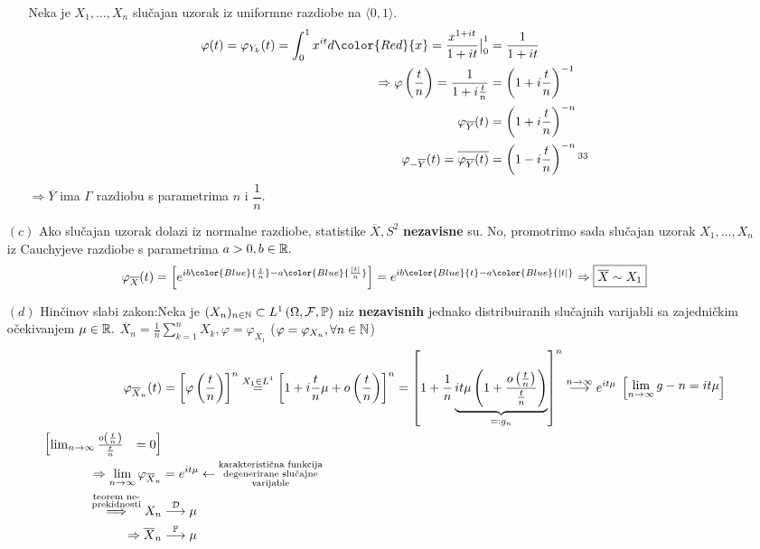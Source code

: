 \documentclass{article}
\begin{document}
\begin{enumerate}
\begin{enumerate}
        \item[] Neka je \(X_1,\ldots,X_n\) slučajan uzorak iz uniformne razdiobe na \(\langle 0,1\rangle.\) \[\begin{aligned}\varphi(t)=\varphi_{Y_k}(t)=\int_0^1x^{it}d{\color{Red}{x}}=\frac{x^{1+it}}{1+it}\big|_0^1&=\frac1{1+it}\\\Rightarrow\varphi\left(\frac{t}n\right)=\frac1{1+i\frac{t}n}&=\left(1+i\frac{t}n\right)^{-1}\\\varphi_{\overline Y}(t)&=\left(1+i\frac{t}n\right)^{-n}\\\varphi_{-\overline Y}(t)=\overline{\varphi_{\overline Y}(t)}&=\left(1-i\frac{t}n\right)^{-n}\footnotemark[33]\end{aligned}\]  \(\Rightarrow\overline Y\) ima \(\Gamma\) razdiobu s parametrima \(n\) i \(\dfrac1n.\) 
    \end{enumerate}
    \item[\((c)\)] Ako slučajan uzorak dolazi iz normalne razdiobe, statistike \(\overline X,S^2\) \textbf{nezavisne} su. No, promotrimo sada slučajan uzorak \(X_1,\ldots,X_n\) iz Cauchyjeve razdiobe s parametrima \(a>0,b\in\Bbb R.\) \[\varphi_{\overline X}(t)=\left[e^{ib{\color{Blue}{\frac{t}n}}-a{\color{Blue}{\frac{|t|}n}}}\right]=e^{ib{\color{Blue}{t}}-a{\color{Blue}{|t|}}}\Rightarrow\boxed{\overline X\sim X_1}\]
    \item[\((d)\)] Hinčinov slabi zakon:\newline Neka je \((X_n)_{n\in\Bbb N}\subset L^1\left(\Omega,\mathcal F,\Bbb P\right)\) niz \textbf{nezavisnih} jednako distribuiranih slučajnih varijabli sa zajedničkim očekivanjem \(\mu\in\Bbb R.\) \(\displaystyle\overline X_n=\frac1n\sum_{k=1}^nX_k,\varphi=\varphi_{X_1}\) (\(\varphi=\varphi_{X_n},\forall n\in\Bbb N\)) \[\begin{aligned}\varphi_{\overline X_n}(t)&=\left[\varphi\left(\frac{t}n\right)\right]^n\overset{X_1\in L^1}{=}\left[1+i\frac{t}n\mu+o\left(\frac{t}n\right)\right]^n=\left[1+\frac1n\underbrace{it\mu\left(1+\frac{o\left(\frac{t}n\right)}{\frac{t}n}\right)}_{=:g_n}\right]^n\overset{n\to\infty}{\longrightarrow}e^{it\mu}\;\begin{bmatrix}\lim\limits_{n\to\infty}g-n=it\mu\end{bmatrix}\\\begin{bmatrix}\lim_{n\to\infty}\frac{o\left(\frac{t}n\right)}{\frac{t}n}&=0\end{bmatrix}\\\Rightarrow\lim_{n\to\infty}\varphi_{\overline X_n}&=e^{it\mu}\leftarrow\substack{\text{karakteristična funkcija}\\\text{degenerirane slučajne}\\\text{varijable}}\\\overset{\substack{\text{teorem ne-}\\\text{prekidnosti}}}{\Longrightarrow}X_n&\overset{\mathcal D}{\longrightarrow}\mu\\\Rightarrow\overline X_n&\overset{\Bbb P}{\longrightarrow}\mu\end{aligned}\]  

\end{enumerate}
\end{document}
